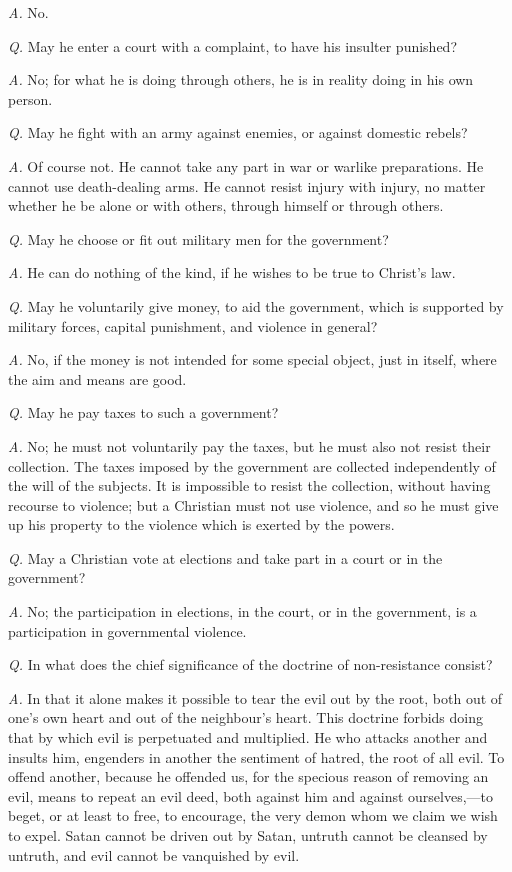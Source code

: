 \documentclass{book}
\begin{document}
\emph{A.} No.

\emph{Q.} May he enter a court with a complaint, to have his insulter punished?

\emph{A.} No; for what he is doing through others, he is in reality doing in his own person.

\emph{Q.} May he fight with an army against enemies, or against domestic rebels?

\emph{A.} Of course not. He cannot take any part in war or warlike preparations. He cannot use death-dealing arms. He cannot resist injury with injury, no matter whether he be alone or with others, through himself or through others.

\emph{Q.} May he choose or fit out military men for the government?

\emph{A.} He can do nothing of the kind, if he wishes to be true to Christ’s law.

\emph{Q.} May he voluntarily give money, to aid the government, which is supported by military forces, capital punishment, and violence in general?

\emph{A.} No, if the money is not intended for some special object, just in itself, where the aim and means are good.

\emph{Q.} May he pay taxes to such a government?

\emph{A.} No; he must not voluntarily pay the taxes, but he must also not resist their collection. The taxes imposed by the government are collected independently of the will of the subjects. It is impossible to resist the collection, without having recourse to violence; but a Christian must not use violence, and so he must give up his property to the violence which is exerted by the powers.

\emph{Q.} May a Christian vote at elections and take part in a court or in the government?

\emph{A.} No; the participation in elections, in the court, or in the government, is a participation in governmental violence.

\emph{Q.} In what does the chief significance of the doctrine of non-resistance consist?

\emph{A.} In that it alone makes it possible to tear the evil out by the root, both out of one’s own heart and out of the neighbour’s heart. This doctrine forbids doing that by which evil is perpetuated and multiplied. He who attacks another and insults him, engenders in another the sentiment of hatred, the root of all evil. To offend another, because he offended us, for the specious reason of removing an evil, means to repeat an evil deed, both against him and against ourselves,—to beget, or at least to free, to encourage, the very demon whom we claim we wish to expel. Satan cannot be driven out by Satan, untruth cannot be cleansed by untruth, and evil cannot be vanquished by evil.
\end{document}
